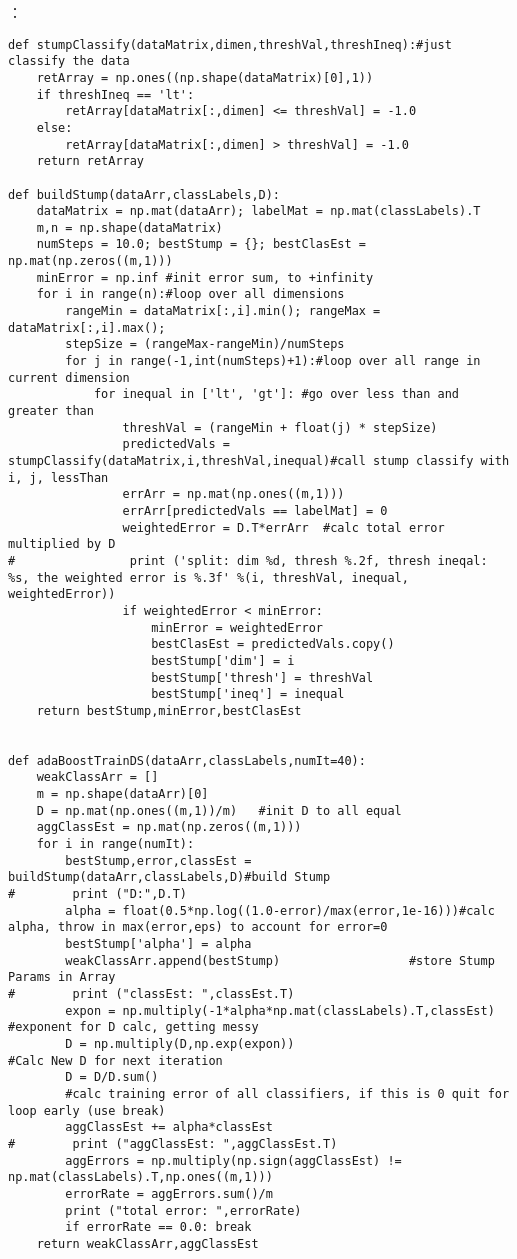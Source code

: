 ：
\begin{lstlisting}
def stumpClassify(dataMatrix,dimen,threshVal,threshIneq):#just classify the data
    retArray = np.ones((np.shape(dataMatrix)[0],1))
    if threshIneq == 'lt':
        retArray[dataMatrix[:,dimen] <= threshVal] = -1.0
    else:
        retArray[dataMatrix[:,dimen] > threshVal] = -1.0
    return retArray

def buildStump(dataArr,classLabels,D):
    dataMatrix = np.mat(dataArr); labelMat = np.mat(classLabels).T
    m,n = np.shape(dataMatrix)
    numSteps = 10.0; bestStump = {}; bestClasEst = np.mat(np.zeros((m,1)))
    minError = np.inf #init error sum, to +infinity
    for i in range(n):#loop over all dimensions
        rangeMin = dataMatrix[:,i].min(); rangeMax = dataMatrix[:,i].max();
        stepSize = (rangeMax-rangeMin)/numSteps
        for j in range(-1,int(numSteps)+1):#loop over all range in current dimension
            for inequal in ['lt', 'gt']: #go over less than and greater than
                threshVal = (rangeMin + float(j) * stepSize)
                predictedVals = stumpClassify(dataMatrix,i,threshVal,inequal)#call stump classify with i, j, lessThan
                errArr = np.mat(np.ones((m,1)))
                errArr[predictedVals == labelMat] = 0
                weightedError = D.T*errArr  #calc total error multiplied by D
#                print ('split: dim %d, thresh %.2f, thresh ineqal: %s, the weighted error is %.3f' %(i, threshVal, inequal, weightedError))
                if weightedError < minError:
                    minError = weightedError
                    bestClasEst = predictedVals.copy()
                    bestStump['dim'] = i
                    bestStump['thresh'] = threshVal
                    bestStump['ineq'] = inequal
    return bestStump,minError,bestClasEst


def adaBoostTrainDS(dataArr,classLabels,numIt=40):
    weakClassArr = []
    m = np.shape(dataArr)[0]
    D = np.mat(np.ones((m,1))/m)   #init D to all equal
    aggClassEst = np.mat(np.zeros((m,1)))
    for i in range(numIt):
        bestStump,error,classEst = buildStump(dataArr,classLabels,D)#build Stump
#        print ("D:",D.T)
        alpha = float(0.5*np.log((1.0-error)/max(error,1e-16)))#calc alpha, throw in max(error,eps) to account for error=0
        bestStump['alpha'] = alpha
        weakClassArr.append(bestStump)                  #store Stump Params in Array
#        print ("classEst: ",classEst.T)
        expon = np.multiply(-1*alpha*np.mat(classLabels).T,classEst) #exponent for D calc, getting messy
        D = np.multiply(D,np.exp(expon))                              #Calc New D for next iteration
        D = D/D.sum()
        #calc training error of all classifiers, if this is 0 quit for loop early (use break)
        aggClassEst += alpha*classEst
#        print ("aggClassEst: ",aggClassEst.T)
        aggErrors = np.multiply(np.sign(aggClassEst) != np.mat(classLabels).T,np.ones((m,1)))
        errorRate = aggErrors.sum()/m
        print ("total error: ",errorRate)
        if errorRate == 0.0: break
    return weakClassArr,aggClassEst
\end{lstlisting}

